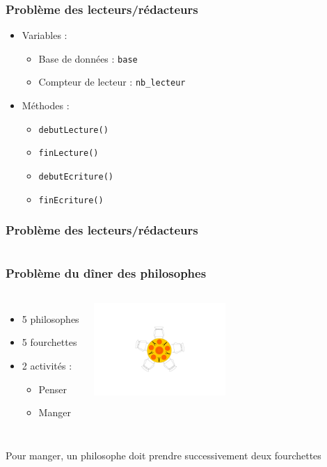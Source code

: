\begin{frame}
\frametitle{Problème des lecteurs/rédacteurs}
\begin{itemize}
\item Variables :
\begin{itemize}
\item Base de données : \texttt{base}
\item Compteur de lecteur : \texttt{nb\_lecteur}
\end{itemize}
\item Méthodes :
\begin{itemize}
\item \texttt{debutLecture()}
\item \texttt{finLecture()}
\item \texttt{debutEcriture()}
\item \texttt{finEcriture()}
\end{itemize}
\end{itemize}
\end{frame}

\begin{frame}
\frametitle{Problème des lecteurs/rédacteurs}
\begin{columns}
\begin{scriptsize}\end{scriptsize}
\begin{scriptsize}\end{scriptsize}
\end{columns}
\end{frame}


\begin{frame}
\frametitle{Problème du dîner des philosophes}
\begin{columns}
\begin{itemize}
\item 5 philosophes
\item 5 fourchettes
\item 2 activités :
\begin{itemize}
\item Penser
\item Manger
\end{itemize}
\end{itemize}
\includegraphics[width=5cm]{../illustration/diner_philosophes.pdf}
\end{columns}
\begin{center}
Pour manger, un philosophe doit prendre successivement deux fourchettes
\end{center}
\end{frame}

